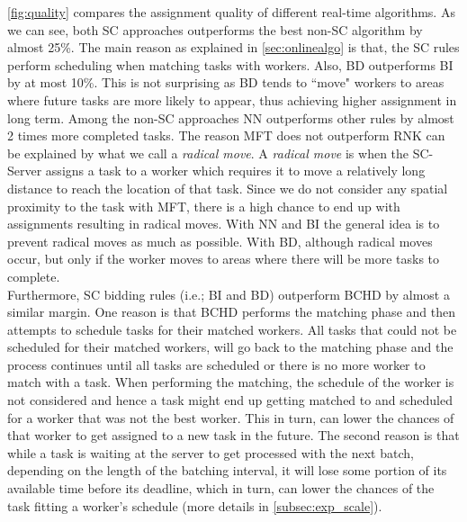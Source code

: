 \cref{fig:quality} compares the assignment quality of different real-time algorithms. As we can see, both SC approaches outperforms the best non-SC algorithm by almost 25\%. The main reason as explained in \cref{sec:onlinealgo} is that, the SC rules perform scheduling when matching tasks with workers. Also, BD outperforms BI by at most 10\%. This is not surprising as BD tends to ``move" workers to areas where future tasks are more likely to appear, thus achieving higher assignment in long term. Among the non-SC approaches NN outperforms other rules by almost 2 times more completed tasks. The reason MFT does not outperform RNK can be explained by what we call a \emph{radical move}. A \emph{radical move} is when the SC-Server assigns a task to a worker which requires it to move a relatively long distance to reach the location of that task. Since we do not consider any spatial proximity to the task with MFT, there is a high chance to end up with assignments resulting in radical moves. With NN and BI the general idea is to prevent radical moves as much as possible. With BD, although radical moves occur, but only if the worker moves to areas where there will be more tasks to complete.\\

Furthermore, SC bidding rules (i.e.; BI and BD) outperform BCHD by almost a similar margin. One reason is that BCHD performs the matching phase and then attempts to schedule tasks for their matched workers. All tasks that could not be scheduled for their matched workers, will go back to the matching phase and the process continues until all tasks are scheduled or there is no more worker to match with a task. When performing the matching, the schedule of the worker is not considered and hence a task might end up getting matched to and scheduled for a worker that was not the best worker. This in turn, can lower the chances of that worker to get assigned to a new task in the future. The second reason is that while a task is waiting at the server to get processed with the next batch, depending on the length of the batching  interval, it will lose some portion of its available time before its deadline, which in turn, can lower the chances of the task fitting a worker's schedule (more details in \cref{subsec:exp_scale}).\\

